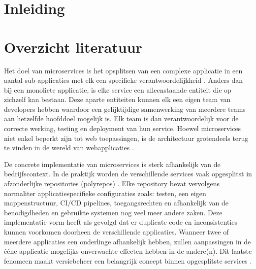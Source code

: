 \documentclass{hogent-article}
\affiliation{
  \textsuperscript{1} \href{mailto:liam.goethals@student.hogent.be}{liam.goethals@student.hogent.be}}
\begin{document}
\flushbottom %
\maketitle %
\tableofcontents %
\thispagestyle{empty} %


\section{Inleiding}


\lipsum[1-3]

\section{Overzicht literatuur}
Het doel van microservices is het opsplitsen van een complexe applicatie in een aantal sub-applicaties met elk een specifieke verantwoordelijkheid \autocite{Thoenes2015}. Anders dan bij een monoliete applicatie, is elke service een alleenstaande entiteit die op zichzelf kan bestaan. Deze aparte entiteiten kunnen elk een eigen team van developers hebben waardoor een gelijktijdige samenwerking van meerdere teams aan hetzelfde hoofddoel mogelijk is. Elk team is dan verantwoordelijk voor de correcte werking, testing en deployment van hun service.
Hoewel microservices niet enkel beperkt zijn tot web toepassingen, is de architectuur grotendeels terug te vinden in de wereld van webapplicaties \autocite{Richardson2019}.

De concrete implementatie van microservices is sterk afhankelijk van de bedrijfscontext. In de praktijk worden de verschillende services vaak opgesplitst in afzonderlijke repositories (polyrepos) \autocite{Brousse2019}. Elke repository bevat vervolgens normaliter applicatiespecifieke configuraties zoals: testen, een eigen mappenstructuur, CI/CD pipelines, toegangsrechten en afhankelijk van de benodigdheden en gebruikte systemen nog veel meer andere zaken. Deze implementatie vorm heeft als gevolgd dat er duplicate code en inconsistenties kunnen voorkomen doorheen de verschillende applicaties. Wanneer twee of meerdere applicaties een onderlinge afhankelijk hebben, zullen aanpassingen in de \'e\'ene applicatie mogelijks onverwachte effecten hebben in de andere(n). Dit laatste fenomeen maakt versiebeheer een belangrijk concept binnen opgesplitste services \autocite{Richardson2019}.
\end{document}
